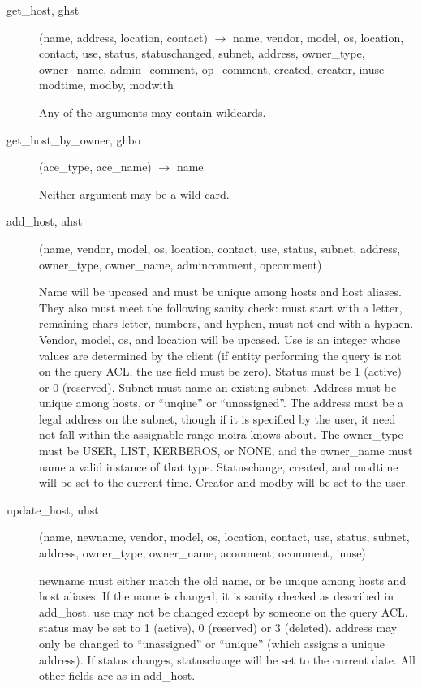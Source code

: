 \documentclass{article}
\begin{document}
\begin{description}
\item[get\_host, ghst](name, address, location, contact) $\rightarrow$ name,
vendor, model, os, location, contact, use, status, statuschanged,
subnet, address, owner\_type, owner\_name, admin\_comment, op\_comment,
created, creator, inuse modtime, modby, modwith

Any of the arguments may contain wildcards.

\item[get\_host\_by\_owner, ghbo](ace\_type, ace\_name) $\rightarrow$
name

Neither argument may be a wild card.

\item[add\_host, ahst](name, vendor, model, os, location, contact, use,
status, subnet, address, owner\_type, owner\_name, admincomment,
opcomment)

Name will be upcased and must be unique among hosts and host aliases.
They also must meet the following sanity check: must start with a
letter, remaining chars letter, numbers, and hyphen, must not end with
a hyphen.  Vendor, model, os, and location will be upcased.  Use is an
integer whose values are determined by the client (if entity
performing the query is not on the query ACL, the use field must be
zero).  Status must be 1 (active) or 0 (reserved).  Subnet must name
an existing subnet.  Address must be unique among hosts, or ``unqiue''
or ``unassigned''.  The address must be a legal address on the subnet,
though if it is specified by the user, it need not fall within the
assignable range moira knows about.  The owner\_type must be USER,
LIST, KERBEROS, or NONE, and the owner\_name must name a valid instance
of that type.  Statuschange, created, and modtime will be set to the
current time.  Creator and modby will be set to the user.

\item[update\_host, uhst](name, newname, vendor, model, os, location,
contact, use, status, subnet, address, owner\_type, owner\_name,
acomment, ocomment, inuse)

newname must either match the old name, or be unique among hosts and
host aliases.  If the name is changed, it is sanity checked as
described in add\_host.  use may not be changed except by someone on
the query ACL.  status may be set to 1 (active), 0 (reserved) or 3
(deleted).  address may only be changed to ``unassigned'' or ``unique''
(which assigns a unique address).  If status changes, statuschange
will be set to the current date.  All other fields are as in add\_host.


\end{description}
\end{document}
